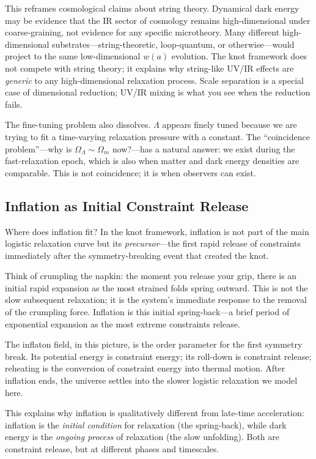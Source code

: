 \documentclass[11pt,a4paper]{article}
\begin{document}
This reframes cosmological claims about string theory. Dynamical dark energy may be evidence that the IR sector of cosmology remains high-dimensional under coarse-graining, not evidence for any specific microtheory. Many different high-dimensional substrates---string-theoretic, loop-quantum, or otherwise---would project to the same low-dimensional $w(a)$ evolution. The knot framework does not compete with string theory; it explains why string-like UV/IR effects are \emph{generic} to any high-dimensional relaxation process. Scale separation is a special case of dimensional reduction; UV/IR mixing is what you see when the reduction fails.

The fine-tuning problem also dissolves. $\Lambda$ appears finely tuned because we are trying to fit a time-varying relaxation pressure with a constant. The ``coincidence problem''---why is $\Omega_\Lambda \sim \Omega_m$ now?---has a natural answer: we exist during the fast-relaxation epoch, which is also when matter and dark energy densities are comparable. This is not coincidence; it is when observers can exist.

\subsection{Inflation as Initial Constraint Release}

Where does inflation fit? In the knot framework, inflation is not part of the main logistic relaxation curve but its \emph{precursor}---the first rapid release of constraints immediately after the symmetry-breaking event that created the knot.

Think of crumpling the napkin: the moment you release your grip, there is an initial rapid expansion as the most strained folds spring outward. This is not the slow subsequent relaxation; it is the system's immediate response to the removal of the crumpling force. Inflation is this initial spring-back---a brief period of exponential expansion as the most extreme constraints release.

The inflaton field, in this picture, is the order parameter for the first symmetry break. Its potential energy is constraint energy; its roll-down is constraint release; reheating is the conversion of constraint energy into thermal motion. After inflation ends, the universe settles into the slower logistic relaxation we model here.

This explains why inflation is qualitatively different from late-time acceleration: inflation is the \emph{initial condition} for relaxation (the spring-back), while dark energy is the \emph{ongoing process} of relaxation (the slow unfolding). Both are constraint release, but at different phases and timescales.
\end{document}
